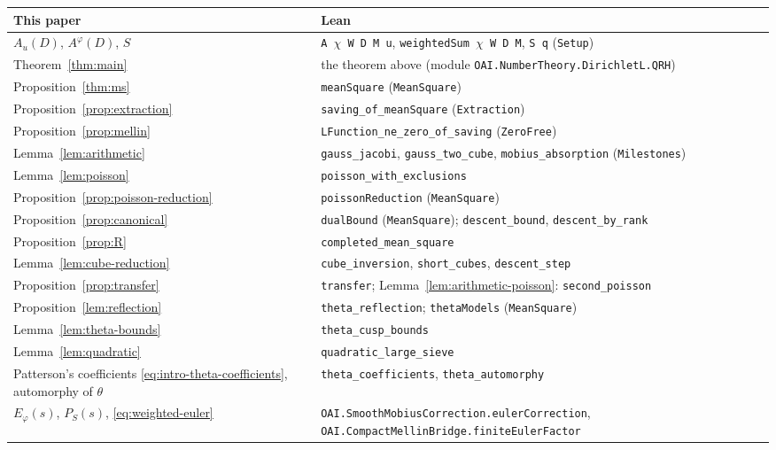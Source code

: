 \documentclass[11pt,a4paper]{article}
\numberwithin{equation}{section}
\numberwithin{figure}{section}
\theoremstyle{definition}
\theoremstyle{remark}
\begin{document}
\medskip
{\small\raggedright
\begin{tabular}{@{}p{}p{}@{}}
\toprule
This paper & Lean\\
\midrule
$A_u(D)$, $A^\varphi(D)$, $S$ & \texttt{A }$\chi$\texttt{ W D M u}, \texttt{weightedSum }$\chi$\texttt{ W D M}, \texttt{S q} (\texttt{Setup})\\
Theorem~\ref{thm:main} & the theorem above (module \texttt{OAI.NumberTheory.\allowbreak DirichletL.\allowbreak QRH})\\
Proposition~\ref{thm:ms} & \texttt{meanSquare} (\texttt{MeanSquare})\\
Proposition~\ref{prop:extraction} & \texttt{saving\_of\_meanSquare} (\texttt{Extraction})\\
Proposition~\ref{prop:mellin} & \texttt{LFunction\_ne\_zero\_of\_saving} (\texttt{ZeroFree})\\
Lemma~\ref{lem:arithmetic} & \texttt{gauss\_jacobi}, \texttt{gauss\_two\_cube}, \texttt{mobius\_absorption} (\texttt{Milestones})\\
Lemma~\ref{lem:poisson} & \texttt{poisson\_with\_exclusions}\\
Proposition~\ref{prop:poisson-reduction} & \texttt{poissonReduction} (\texttt{MeanSquare})\\
Proposition~\ref{prop:canonical} & \texttt{dualBound} (\texttt{MeanSquare}); \texttt{descent\_bound}, \texttt{descent\_by\_rank}\\
Proposition~\ref{prop:R} & \texttt{completed\_mean\_square}\\
Lemma~\ref{lem:cube-reduction} & \texttt{cube\_inversion}, \texttt{short\_cubes}, \texttt{descent\_step}\\
Proposition~\ref{prop:transfer} & \texttt{transfer}; Lemma~\ref{lem:arithmetic-poisson}: \texttt{second\_poisson}\\
Proposition~\ref{lem:reflection} & \texttt{theta\_reflection}; \texttt{thetaModels} (\texttt{MeanSquare})\\
Lemma~\ref{lem:theta-bounds} & \texttt{theta\_cusp\_bounds}\\
Lemma~\ref{lem:quadratic} & \texttt{quadratic\_large\_sieve}\\
Patterson's coefficients \eqref{eq:intro-theta-coefficients}, automorphy of $\theta$ & \texttt{theta\_coefficients}, \texttt{theta\_automorphy}\\
$E_\varphi(s)$, $P_S(s)$, \eqref{eq:weighted-euler} & \texttt{OAI.SmoothMobiusCorrection.\allowbreak eulerCorrection}, \texttt{OAI.CompactMellinBridge.\allowbreak finiteEulerFactor}\\
\bottomrule
\end{tabular}\par}
\end{document}
